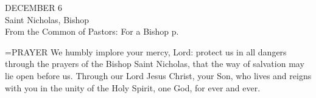 \begin{center}\normalsize DECEMBER 6\\
\footnotesize Saint Nicholas, Bishop\\
\footnotesize From the Common of Pastors: For a Bishop p.\\
\end{center}

\hangindent=\parindent \small{PRAYER 
We humbly implore your mercy, Lord:
protect us in all dangers
through the prayers of the Bishop Saint Nicholas,
that the way of salvation may lie open before us.
Through our Lord Jesus Christ, your Son,
who lives and reigns with you in the unity of the Holy Spirit,
one God, for ever and ever.\\}
 
